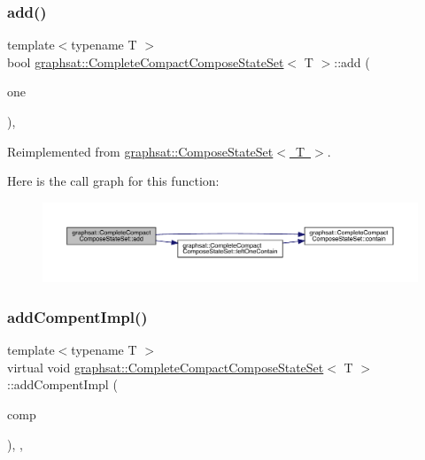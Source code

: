 \subsubsection{\texorpdfstring{add()}{add()}}
{\footnotesize\ttfamily template$<$typename T $>$ \\
bool \mbox{\hyperlink{classgraphsat_1_1_complete_compact_compose_state_set}{graphsat\+::\+Complete\+Compact\+Compose\+State\+Set}}$<$ T $>$\+::add (\begin{DoxyParamCaption}\item[{const vector$<$ pair$<$ int, T $\ast$ $>$$>$ \&}]{one }\end{DoxyParamCaption})\hspace{0.3cm}{\ttfamily [inline]}, {\ttfamily [virtual]}}



Reimplemented from \mbox{\hyperlink{classgraphsat_1_1_compose_state_set_a0f359257087c8ae10bf25881f9448395}{graphsat\+::\+Compose\+State\+Set$<$ T $>$}}.

Here is the call graph for this function\+:\nopagebreak
\begin{figure}[H]
\begin{center}
\leavevmode
\includegraphics[width=350pt]{classgraphsat_1_1_complete_compact_compose_state_set_aaf32e840a543a728f1b849e6c8aecab8_cgraph}
\end{center}
\end{figure}
\mbox{\label{classgraphsat_1_1_complete_compact_compose_state_set_af45ca7e6d6b308d8bdb6f91e0d7830c0}} 
\subsubsection{\texorpdfstring{addCompentImpl()}{addCompentImpl()}}
{\footnotesize\ttfamily template$<$typename T $>$ \\
virtual void \mbox{\hyperlink{classgraphsat_1_1_complete_compact_compose_state_set}{graphsat\+::\+Complete\+Compact\+Compose\+State\+Set}}$<$ T $>$\+::add\+Compent\+Impl (\begin{DoxyParamCaption}\item[{\mbox{\hyperlink{classgraphsat_1_1_single_state_set}{Single\+State\+Set}}$<$ T $>$ \&}]{comp }\end{DoxyParamCaption})\hspace{0.3cm}{\ttfamily [inline]}, {\ttfamily [private]}, {\ttfamily [virtual]}}



